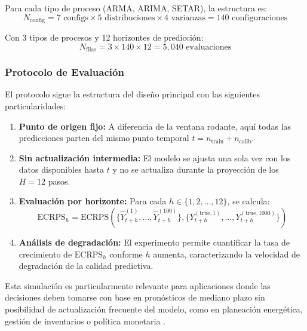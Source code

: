 Para cada tipo de proceso (ARMA, ARIMA, SETAR), la estructura es:
\begin{equation}
N_{\text{config}} = 7 \text{ configs} \times 5 \text{ distribuciones} \times 4 \text{ varianzas} = 140 \text{ configuraciones}
\end{equation}

Con 3 tipos de procesos y 12 horizontes de predicción:
\begin{equation}
N_{\text{filas}} = 3 \times 140 \times 12 = 5{,}040 \text{ evaluaciones}
\end{equation}

\subsubsection{Protocolo de Evaluación}

El protocolo sigue la estructura del diseño principal con las siguientes particularidades:

\begin{enumerate}
\item \textbf{Punto de origen fijo:} A diferencia de la ventana rodante, aquí todas las predicciones parten del mismo punto temporal $t = n_{\text{train}} + n_{\text{calib}}$.

\item \textbf{Sin actualización intermedia:} El modelo se ajusta una sola vez con los datos disponibles hasta $t$ y no se actualiza durante la proyección de los $H=12$ pasos.

\item \textbf{Evaluación por horizonte:} Para cada $h \in \{1, 2, \ldots, 12\}$, se calcula:
\begin{equation}
\text{ECRPS}_h = \text{ECRPS}\left(\{\hat{Y}_{t+h}^{(1)}, \ldots, \hat{Y}_{t+h}^{(100)}\}, \{Y_{t+h}^{(\text{true}, 1)}, \ldots, Y_{t+h}^{(\text{true}, 1000)}\}\right)
\end{equation}

\item \textbf{Análisis de degradación:} El experimento permite cuantificar la tasa de crecimiento de $\text{ECRPS}_h$ conforme $h$ aumenta, caracterizando la velocidad de degradación de la calidad predictiva.
\end{enumerate}

Esta simulación es particularmente relevante para aplicaciones donde las decisiones deben tomarse con base en pronósticos de mediano plazo sin posibilidad de actualización frecuente del modelo, como en planeación energética, gestión de inventarios o política monetaria \parencite{Hyndman2021FPP3}.


